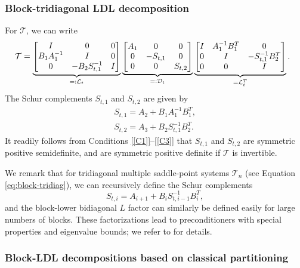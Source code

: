 \documentclass{article}
\newcommand{\sD}{\mathcal{D}}
\newcommand{\sL}{\mathcal{L}}
\newcommand{\sT}{\mathcal{T}}
\begin{document}
\subsubsection{Block-tridiagonal LDL decomposition}
\label{sec:block-tri-ldl}
For $\sT$, we can write \cite{bg22}
\begin{equation}
		\label{eq:tri_ldl}
		\hspace{-2mm}
		\sT =
        \underbrace{
		\begin{bmatrix}
			I & 0 & 0 \\
			B_1A_1^{-1} & I & 0 \\
			0 & -B_2S_{t,1}^{-1} & I
		\end{bmatrix}}_{=: \sL_t}
		\underbrace{
			\begin{bmatrix}
				A_1 & 0 & 0 \\
				0 & -S_{t,1} & 0 \\
				0 & 0 & S_{t,2}
		\end{bmatrix}}_{=: \sD_t}
        \underbrace{
		\begin{bmatrix}
			I & A_1^{-1}B_1^T & 0 \\
			0 & I & -S_{t,1}^{-1}B_2^T \\
			0 & 0 & I
		\end{bmatrix}}_{=\sL_t^T}.
	\end{equation}
The Schur complements $S_{t,1}$ and $S_{t,2}$ are given by
\begin{subequations}
\begin{gather}
S_{t,1} = A_2 + B_1 A_1^{-1} B_1^T, \\
S_{t,2} = A_3 + B_2S_{t,1}^{-1}B_2^T.
\end{gather}
\end{subequations}
It readily follows from Conditions \ref{[C1]}--\ref{[C3]} that $S_{t,1}$ and $S_{t,2}$ are symmetric positive semidefinite, and are symmetric positive definite if $\sT$ is invertible.

We remark that for tridiagonal multiple saddle-point systems $\sT_n$ (see Equation \eqref{eq:block-tridiag}), we can recursively define the Schur complements
\[
S_{t,i} = A_{i+1} + B_i S_{t,i-1}^{-1} B_i^T,
\]
and the block-lower bidiagonal $L$ factor can similarly be defined easily for large numbers of blocks. These factorizations lead to preconditioners with special properties and eigenvalue bounds; we refer to \cite{pp21,sz18} for details.

\subsubsection{Block-LDL decompositions based on classical partitioning}
\label{sec:classical}
\end{document}
